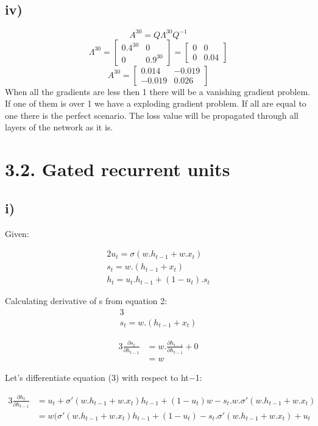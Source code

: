 \subsection*{iv)}
\[A^{30} = Q\Lambda^{30}Q^{-1}\]
\[\Lambda^{30}=\begin{bmatrix}
    0.4^{30} & 0\\
    0 & 0.9^{30}
\end{bmatrix} =
\begin{bmatrix}
    0 & 0\\
    0 & 0.04
\end{bmatrix}\]
\[A^{30} = \begin{bmatrix}
    0.014 & -0.019\\
    -0.019 & 0.026
\end{bmatrix}\]
When all the gradients are less then 1 there will be a vanishing  gradient problem. If one of them is over 1 we have a exploding gradient problem. If all are equal to one there is the perfect scenario. The loss value will be propagated through all layers of the network as it is.
\section*{3.2. Gated recurrent units}
\subsection*{i)}

Given:

\begin{alignat}{2}
u_t = \sigma (w.h_{t-1} + w.x_t)
\\s_t = w. (h_{t-1} + x_t)
\\h_t = u_t. h_{t-1}  + (1-u_t) . s_t
\end{alignat}

Calculating derivative of s from equation 2:
\begin{alignat}{3}
\\s_t = w. (h_{t-1} + x_t)
\end{alignat}

\begin{alignat}{3}
\frac {\partial s_t}{\partial h_{t-1}} &= w.\frac{\partial h_{t-1}}{\partial h_{t-1}} + 0 
\\ &= w
\end{alignat}

Let's differentiate equation (3) with respect to ht−1:

\begin{alignat}{3}
\frac {\partial h_t}{\partial h_{t-1}} &= u_t +   \sigma'(w.h_{t-1}+w.x_t)h_{t-1} + (1-u_t)w - s_t.w.\sigma'(w.h_{t-1}+w.x_t)
\\ &= w(\sigma'(w.h_{t-1} + w.x_t)h_{t-1} + (1-u_t) - s_t.\sigma'(w.h_{t-1} + w.x_t) + u_t
\end{alignat}

